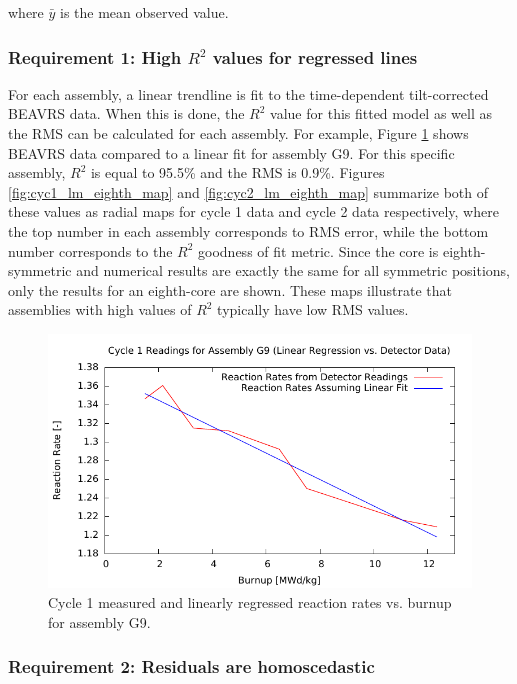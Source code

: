 \documentclass{article}
\begin{document}
where $\bar{y}$ is the mean observed value.

\subsubsection*{Requirement 1: High $R^2$ values for regressed lines}

For each assembly, a linear trendline is fit to the time-dependent tilt-corrected BEAVRS data. When this is done, the $R^2$ value for this fitted model as well as the RMS can be calculated for each assembly. For example, Figure \ref{fig:lm_G9} shows BEAVRS data compared to a linear fit for assembly G9. For this specific assembly, $R^2$ is equal to 95.5\% and the RMS is 0.9\%. Figures \ref{fig:cyc1_lm_eighth_map} and \ref{fig:cyc2_lm_eighth_map} summarize both of these values as radial maps for cycle 1 data and cycle 2 data respectively, where the top number in each assembly corresponds to RMS error, while the bottom number corresponds to the $R^2$ goodness of fit metric. Since the core is eighth-symmetric and numerical results are exactly the same for all symmetric positions, only the results for an eighth-core are shown. These maps illustrate that assemblies with high values of $R^2$ typically have low RMS values.


\begin{figure}[!htb]
\centering
\includegraphics[keepaspectratio, width = 4.5 in]{figures/G9.pdf}
\caption{Cycle 1 measured and linearly regressed reaction rates vs. burnup for assembly G9.}
\label{fig:lm_G9}
\end{figure}




\subsubsection*{Requirement 2: Residuals are homoscedastic}
\end{document}
